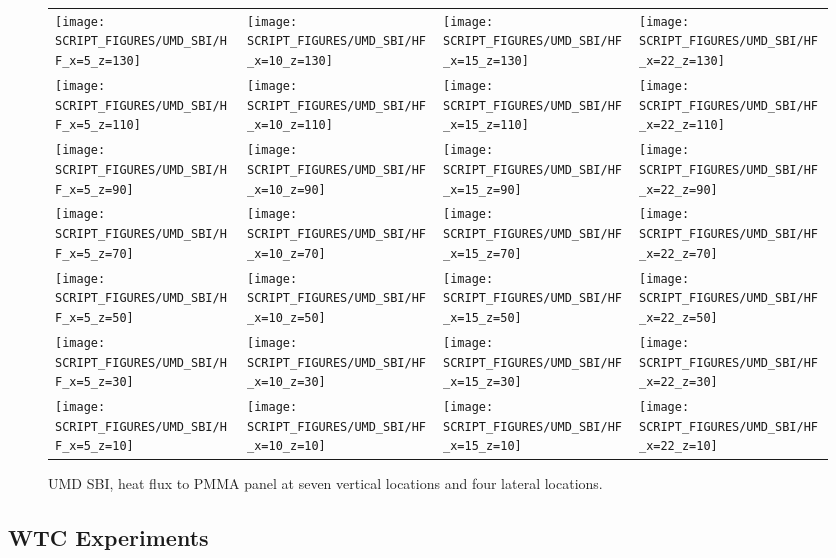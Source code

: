 \newpage

\begin{figure}[p]
\begin{tabular*}{\textwidth}{llll}
\texttt{[image: SCRIPT\_FIGURES/UMD\_SBI/HF\_x=5\_z=130]} &
\texttt{[image: SCRIPT\_FIGURES/UMD\_SBI/HF\_x=10\_z=130]} &
\texttt{[image: SCRIPT\_FIGURES/UMD\_SBI/HF\_x=15\_z=130]} &
\texttt{[image: SCRIPT\_FIGURES/UMD\_SBI/HF\_x=22\_z=130]} \\
\texttt{[image: SCRIPT\_FIGURES/UMD\_SBI/HF\_x=5\_z=110]} &
\texttt{[image: SCRIPT\_FIGURES/UMD\_SBI/HF\_x=10\_z=110]} &
\texttt{[image: SCRIPT\_FIGURES/UMD\_SBI/HF\_x=15\_z=110]} &
\texttt{[image: SCRIPT\_FIGURES/UMD\_SBI/HF\_x=22\_z=110]} \\
\texttt{[image: SCRIPT\_FIGURES/UMD\_SBI/HF\_x=5\_z=90]} &
\texttt{[image: SCRIPT\_FIGURES/UMD\_SBI/HF\_x=10\_z=90]} &
\texttt{[image: SCRIPT\_FIGURES/UMD\_SBI/HF\_x=15\_z=90]} &
\texttt{[image: SCRIPT\_FIGURES/UMD\_SBI/HF\_x=22\_z=90]} \\
\texttt{[image: SCRIPT\_FIGURES/UMD\_SBI/HF\_x=5\_z=70]} &
\texttt{[image: SCRIPT\_FIGURES/UMD\_SBI/HF\_x=10\_z=70]} &
\texttt{[image: SCRIPT\_FIGURES/UMD\_SBI/HF\_x=15\_z=70]} &
\texttt{[image: SCRIPT\_FIGURES/UMD\_SBI/HF\_x=22\_z=70]} \\
\texttt{[image: SCRIPT\_FIGURES/UMD\_SBI/HF\_x=5\_z=50]} &
\texttt{[image: SCRIPT\_FIGURES/UMD\_SBI/HF\_x=10\_z=50]} &
\texttt{[image: SCRIPT\_FIGURES/UMD\_SBI/HF\_x=15\_z=50]} &
\texttt{[image: SCRIPT\_FIGURES/UMD\_SBI/HF\_x=22\_z=50]} \\
\texttt{[image: SCRIPT\_FIGURES/UMD\_SBI/HF\_x=5\_z=30]} &
\texttt{[image: SCRIPT\_FIGURES/UMD\_SBI/HF\_x=10\_z=30]} &
\texttt{[image: SCRIPT\_FIGURES/UMD\_SBI/HF\_x=15\_z=30]} &
\texttt{[image: SCRIPT\_FIGURES/UMD\_SBI/HF\_x=22\_z=30]} \\
\texttt{[image: SCRIPT\_FIGURES/UMD\_SBI/HF\_x=5\_z=10]} &
\texttt{[image: SCRIPT\_FIGURES/UMD\_SBI/HF\_x=10\_z=10]} &
\texttt{[image: SCRIPT\_FIGURES/UMD\_SBI/HF\_x=15\_z=10]} &
\texttt{[image: SCRIPT\_FIGURES/UMD\_SBI/HF\_x=22\_z=10]} 
\end{tabular*}
\caption[UMD SBI heat flux to PMMA panel]{UMD SBI, heat flux to PMMA panel at seven vertical locations and four lateral locations.}
\label{UMD_SBI_HF}
\end{figure}


\clearpage

\subsection{WTC Experiments}

